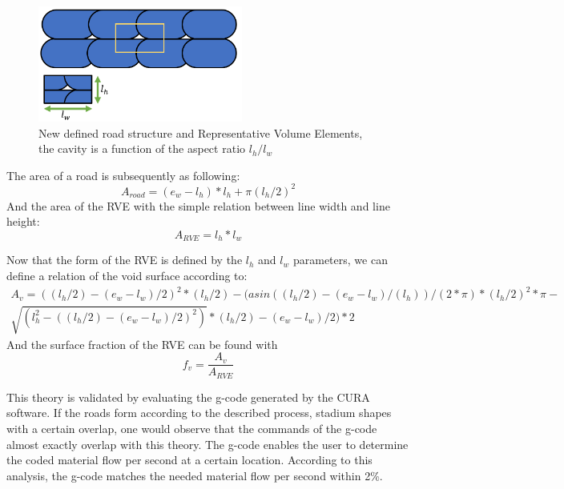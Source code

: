 \begin{figure}[H]
    \centering
    \includegraphics[width=0.6\textwidth]{chapter_4_RVE_Definition/figures/Roadstructure2.PNG}
    \caption{New defined road structure and Representative Volume Elements, the cavity is a function of the aspect ratio $l_h/l_w$}
    \label{fig:Roadstructure2}
\end{figure}

The area of a road is subsequently as following: 
\begin{equation} \label{eqn:crazecriterion}
A_{road}=(e_w-l_h)*l_h+\pi(l_h/2)^2
\end{equation}
And the area of the RVE with the simple relation between line width and line height:
\begin{equation} \label{eqn:crazecriterion}
A_{RVE}=l_h*l_w
\end{equation}

Now that the form of the RVE is defined by the $l_h$ and $l_w$ parameters, we can define a relation of the void surface according to: 
\begin{align*}
A_v = ((l_h/2)-(e_w-l_w)/2)^2*(l_h/2)-(asin((l_h/2)-(e_w-l_w)/(l_h))/(2*\pi)*(l_h/2)^2*\pi  -\\
\sqrt{(l_h^2-((l_h/2)-(e_w-l_w)/2)^2 )}*(l_h/2)-(e_w-l_w)/2 )*2
\end{align*}
And the surface fraction of the RVE can be found with
\begin{equation}
f_v = \frac{A_v}{A_{RVE}}
\end{equation}

This theory is validated by evaluating the g-code generated by the CURA software. If the roads form according to the described process, stadium shapes with a certain overlap, one would observe that the commands of the g-code almost exactly overlap with this theory. The g-code enables the user to determine the coded material flow per second at a certain location. According to this analysis, the g-code matches the needed material flow per second within 2\%.

